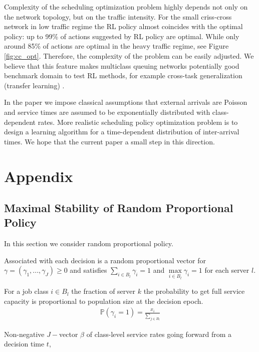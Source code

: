 \documentclass[11pt]{article}
\newcommand{\Prob}{\mathbb{P}}
\theoremstyle{definition}
\numberwithin{equation}{section}
\begin{document}
Complexity of the scheduling optimization problem highly depends not only on the network topology, but on the traffic intensity. For the small criss-cross network in low traffic regime the RL policy almost coincides with the optimal policy:  up to 99\% of actions suggested  by RL policy are optimal. While   only around 85\% of actions are optimal in the heavy traffic regime, see Figure \ref{fig:cc_opt}. Therefore, the complexity of the problem can be easily adjusted.  We believe that this feature makes multiclass queuing networks potentially  good benchmark domain to test RL methods, for example cross-task generalization (transfer learning)  \cite{Nichol2018}.



In the paper we impose classical assumptions that external arrivals are Poisson and service
times are assumed to be exponentially distributed with class-dependent rates. More realistic scheduling policy optimization problem  is to design a learning algorithm for a time-dependent distribution of inter-arrival times. We hope that the current paper a small step in this direction.




\section{Appendix}





\subsection{Maximal Stability of Random Proportional Policy}\label{sec:RP}

In this section we consider random proportional policy. 

Associated with each decision is a random proportional vector for $\gamma = (\gamma_1, ..., \gamma_J)\geq 0$ and satisfies $\sum\limits_{i\in B_l} \gamma_i =1$ and $\max\limits_{i\in B_l}\gamma_i =1$ for each server $l$.



For a job class $i\in B_l$ the fraction of server $k$ the probability to get full service capacity is proportional to population size at the decision epoch. 
\begin{align*}
\Prob(\gamma_i = 1) = \frac{x_i}{\sum\limits_{j\in B_l}}
\end{align*}


Non-negative $J-$vector $\beta$ of class-level service rates going forward from a decision time $t$, 
\end{document}
